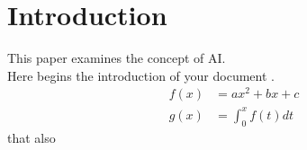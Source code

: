 
\section{Introduction}
This paper examines the concept of \ac{AI}.\\
Here begins the introduction of your document \cite{samplebook}.
\begin{align}
    f(x) &= ax^2 + bx + c \\
    g(x) &= \int_{0}^{x} f(t) dt
\end{align}
that also
